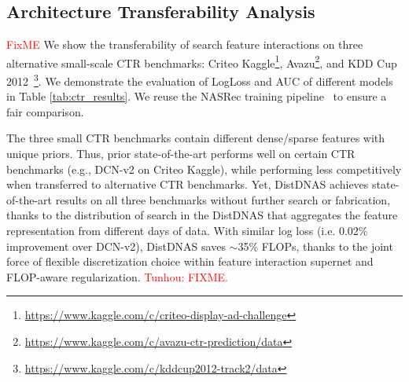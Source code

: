 \iffalse
\subsection{Architecture Transferability Analysis}
\noindent \textcolor{red}{FixME}
We show the transferability of search feature interactions on three alternative small-scale CTR benchmarks:
Criteo Kaggle\footnote{\hyperlink{https://www.kaggle.com/c/criteo-display-ad-challenge}{https://www.kaggle.com/c/criteo-display-ad-challenge}}, Avazu\footnote{\hyperlink{https://www.kaggle.com/c/avazu-ctr-prediction/data}{https://www.kaggle.com/c/avazu-ctr-prediction/data}}, and KDD Cup 2012~\footnote{\hyperlink{https://www.kaggle.com/c/kddcup2012-track2/data}{https://www.kaggle.com/c/kddcup2012-track2/data}}. We demonstrate the evaluation of LogLoss and AUC of different models in Table \ref{tab:ctr_results}. 
We reuse the NASRec training pipeline~\citep{zhang2022nasrec} to ensure a fair comparison.

The three small CTR benchmarks contain different dense/sparse features with unique priors.
Thus, prior state-of-the-art performs well on certain CTR benchmarks (e.g., DCN-v2 on Criteo Kaggle), while performing less competitively when transferred to alternative CTR benchmarks. 
Yet, DistDNAS achieves state-of-the-art results on all three benchmarks without further search or fabrication, thanks to the distribution of search in the DistDNAS that aggregates the feature representation from different days of data.
With similar log loss (i.e. 0.02\% improvement over DCN-v2), DistDNAS saves $\sim$35\% FLOPs, thanks to the joint force of flexible discretization choice within feature interaction supernet and FLOP-aware regularization. \noindent \textcolor{red}{Tunhou: FIXME.}


